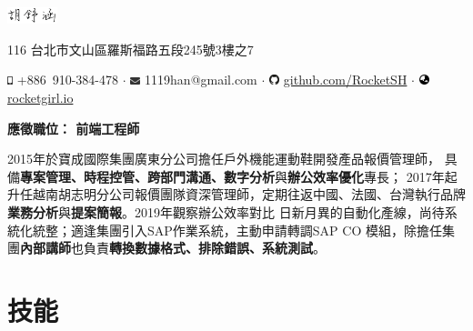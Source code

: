 \documentclass[a4paper,10pt]{article}
\begin{document}
\pagestyle{empty} %
\frenchspacing


\begin{center}
  
  \Huge{\includegraphics[height=1.3em,trim=0 10mm 0 -1cm]{shared/signature.png}}\par

  \normalsize {116 台北市文山區羅斯福路五段245號3樓之7}

  \includegraphics[height=0.7em]{shared/mobile-alt.eps} +886~910-384-478 $\cdot$
  \includegraphics[width=0.8em]{shared/envelope.eps} 1119han@gmail.com $\cdot$
  \includegraphics[width=0.8em]{shared/github.eps}
  \href{https://github.com/RocketSH}{github.com/RocketSH} $\cdot$
  \includegraphics[width=0.8em]{shared/globe-asia.eps} \href{https://rocketgirl.io/}{rocketgirl.io}
\end{center}

\begin{center}
  \vspace*{1em}
  {\large\bfseries 應徵職位： 前端工程師}
  \vspace*{1em}

  \begin{minipage}{0.9\textwidth}
    2015年於寶成國際集團廣東分公司擔任戶外機能運動鞋開發產品報價管理師，
    具備\textbf{專案管理、時程控管、跨部門溝通、數字分析}與\textbf{辦公效率優化}專長；
    2017年起升任越南胡志明分公司報價團隊資深管理師，定期往返中國、法國、台灣執行品牌
    \textbf{業務分析}與\textbf{提案簡報}。2019年觀察辦公效率對比
    日新月異的自動化產線，尚待系統化統整；適逢集團引入SAP作業系統，主動申請轉調SAP CO
    模組，除擔任集團\textbf{內部講師}也負責\textbf{轉換數據格式、排除錯誤、系統測試}。
  \end{minipage}
\end{center}
\vspace*{1em}

\section{技能}
\end{document}
